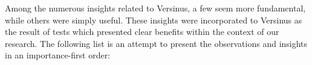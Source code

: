 																																																																																																																																																																																																																																																																																																																																																																																																				Among the numerous insights related to Versinus, a few seem more fundamental, while others were simply useful. These
																																																																																																																																																																																																																																																																																																																																																																																																				insights were incorporated to Versinus as the result of tests which presented clear benefits within the context of our research.
																																																																																																																																																																																																																																																																																																																																																																																																				The following list is an attempt to present the observations and insights in an importance-first order:

